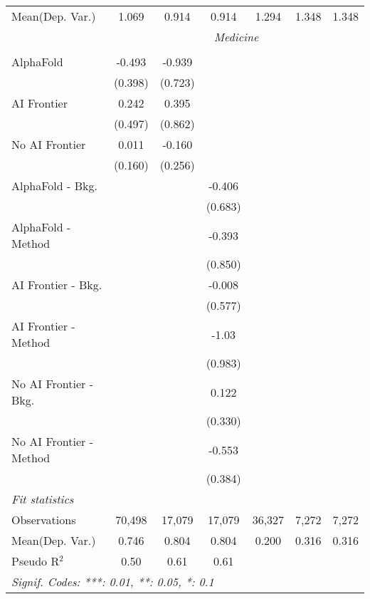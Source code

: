 \begin{tabular}{lcccccc}
Mean(Dep. Var.) & 1.069 & 0.914 & 0.914 & 1.294 & 1.348 & 1.348 \\
 & \multicolumn{6}{c}{\textit{Medicine}} \\ \\
   AlphaFold               & -0.493   & -0.939  &         &        &       &   \\   
                           & (0.398)  & (0.723) &         &        &       &   \\   
   AI Frontier             & 0.242    & 0.395   &         &        &       &   \\   
                           & (0.497)  & (0.862) &         &        &       &   \\   
   No AI Frontier          & 0.011    & -0.160  &         &        &       &   \\   
                           & (0.160)  & (0.256) &         &        &       &   \\   
   AlphaFold - Bkg.        &          &         & -0.406  &        &       &   \\   
                           &          &         & (0.683) &        &       &   \\   
   AlphaFold - Method      &          &         & -0.393  &        &       &   \\   
                           &          &         & (0.850) &        &       &   \\   
   AI Frontier - Bkg.      &          &         & -0.008  &        &       &   \\   
                           &          &         & (0.577) &        &       &   \\   
   AI Frontier - Method    &          &         & -1.03   &        &       &   \\   
                           &          &         & (0.983) &        &       &   \\   
   No AI Frontier - Bkg.   &          &         & 0.122   &        &       &   \\   
                           &          &         & (0.330) &        &       &   \\   
   No AI Frontier - Method &          &         & -0.553  &        &       &   \\   
                           &          &         & (0.384) &        &       &   \\   
   \midrule
   \emph{Fit statistics}\\
   Observations            & 70,498   & 17,079  & 17,079  & 36,327 & 7,272 & 7,272\\  
Mean(Dep. Var.) & 0.746 & 0.804 & 0.804 & 0.200 & 0.316 & 0.316 \\
   Pseudo R$^2$            & 0.50     & 0.61    & 0.61    &        &       & \\  
   \midrule \midrule
   \multicolumn{7}{l}{\emph{Signif. Codes: ***: 0.01, **: 0.05, *: 0.1}}\\
\end{tabular}
\par\endgroup
